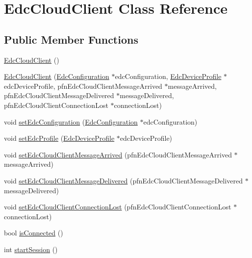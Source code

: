 \hypertarget{class_edc_cloud_client}{\section{Edc\-Cloud\-Client Class Reference}
\label{class_edc_cloud_client}
}
\subsection*{Public Member Functions}
\begin{DoxyCompactItemize}
\item 
\hyperlink{class_edc_cloud_client_a69e35c3d8906b5c13f46c9af7d0535bd}{Edc\-Cloud\-Client} ()
\item 
\hyperlink{class_edc_cloud_client_a2e760410ea4cc1db2b7a9dbbce2bf932}{Edc\-Cloud\-Client} (\hyperlink{class_edc_configuration}{Edc\-Configuration} $\ast$edc\-Configuration, \hyperlink{class_edc_device_profile}{Edc\-Device\-Profile} $\ast$edc\-Device\-Profile, pfn\-Edc\-Cloud\-Client\-Message\-Arrived $\ast$message\-Arrived, pfn\-Edc\-Cloud\-Client\-Message\-Delivered $\ast$message\-Delivered, pfn\-Edc\-Cloud\-Client\-Connection\-Lost $\ast$connection\-Lost)
\item 
void \hyperlink{class_edc_cloud_client_abb7c5cbbe4147bd91ac787cde17b2e84}{set\-Edc\-Configuration} (\hyperlink{class_edc_configuration}{Edc\-Configuration} $\ast$edc\-Configuration)
\item 
void \hyperlink{class_edc_cloud_client_a0ea16b18bca2fa675568972f416052d3}{set\-Edc\-Profile} (\hyperlink{class_edc_device_profile}{Edc\-Device\-Profile} $\ast$edc\-Device\-Profile)
\item 
void \hyperlink{class_edc_cloud_client_a5ca4b7a98de65f9003951aacbb2d3bbb}{set\-Edc\-Cloud\-Client\-Message\-Arrived} (pfn\-Edc\-Cloud\-Client\-Message\-Arrived $\ast$message\-Arrived)
\item 
void \hyperlink{class_edc_cloud_client_aa7f12f5a330eba2d809c9f58ed853669}{set\-Edc\-Cloud\-Client\-Message\-Delivered} (pfn\-Edc\-Cloud\-Client\-Message\-Delivered $\ast$message\-Delivered)
\item 
void \hyperlink{class_edc_cloud_client_a0bd0d7186b2c98c9fb24c7e8bd56df95}{set\-Edc\-Cloud\-Client\-Connection\-Lost} (pfn\-Edc\-Cloud\-Client\-Connection\-Lost $\ast$connection\-Lost)
\item 
bool \hyperlink{class_edc_cloud_client_a20c77fb81d9b47f093d0198e0911cabf}{is\-Connected} ()
\item 
int \hyperlink{class_edc_cloud_client_a1d0be6f491848da0cadacf09a06f2f43}{start\-Session} ()

\end{DoxyCompactItemize}
